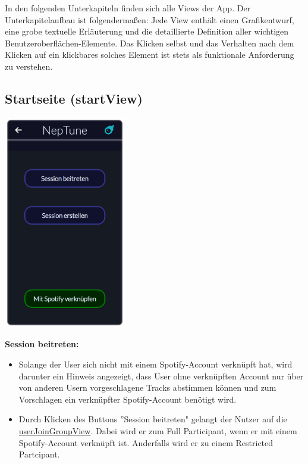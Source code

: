 \documentclass[oneside, ngerman]{sdqtechreport}
\begin{document}
In den folgenden Unterkapiteln finden sich alle Views der App. Der Unterkapitelaufbau ist folgendermaßen: Jede View enthält einen Grafikentwurf, eine grobe textuelle Erläuterung und die detaillierte Definition aller wichtigen Benutzeroberflächen-Elemente. Das Klicken selbst und das Verhalten nach dem Klicken auf ein klickbares solches Element ist stets als funktionale Anforderung zu verstehen.


\subsection{Startseite (startView)}
\label{sec:Benutzeroberfläche:startView}

\begin{center}
    \hypertarget{startView}{}
    \includegraphics[width=0.4\textwidth]{LATEX/Pflichtenheft/GraphicDesigns/startPage.png}
\end{center}

\textbf{Session beitreten:}
\begin{itemize}
    \item Solange der User sich nicht mit einem Spotify-Account verknüpft hat, wird darunter ein Hinweis angezeigt, dass User ohne verknüpften Account nur über von anderen Usern vorgeschlagene Tracks abstimmen können und zum Vorschlagen ein verknüpfter Spotify-Account benötigt wird.
    \item Durch Klicken des Buttons ''Session beitreten" gelangt der Nutzer auf die \hyperlink{userJoinGroupView}{userJoinGroupView}. Dabei wird er zum Full Participant, wenn er mit einem Spotify-Account verknüpft ist. Anderfalls wird er zu einem Restricted Partcipant.
\end{itemize}
\end{document}
